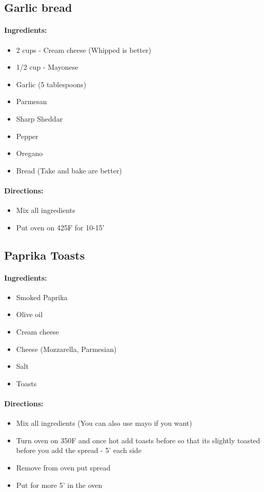 \documentclass{article}
\begin{document}
\subsection{Garlic bread}

\paragraph{Ingredients:}

\begin{itemize}
	\item 2 cups - Cream cheese (Whipped is better)
	\item 1/2 cup - Mayonese 
	\item Garlic (5 tablespoons)
	\item Parmesan
	\item Sharp Sheddar
	\item Pepper
	\item Oregano
	\item Bread (Take and bake are better)
\end{itemize}

\paragraph{Directions:}
\begin{itemize}
	\item Mix all ingredients
	\item Put oven on 425F for 10-15'
\end{itemize}

\subsection{Paprika Toasts}

\paragraph{Ingredients:}

\begin{itemize}
	\item Smoked Paprika
	\item Olive oil
	\item Cream cheese
	\item Cheese (Mozzarella, Parmesian)
	\item Salt
	\item Toasts
\end{itemize}

\paragraph{Directions:}
\begin{itemize}
	\item Mix all ingredients (You can also use mayo if you want)
	\item Turn oven on 350F and once hot add toasts before so that its slightly toasted before you add the spread - 5' each side
	\item Remove from oven put spread
	\item Put for more 5' in the oven
\end{itemize}
\end{document}
